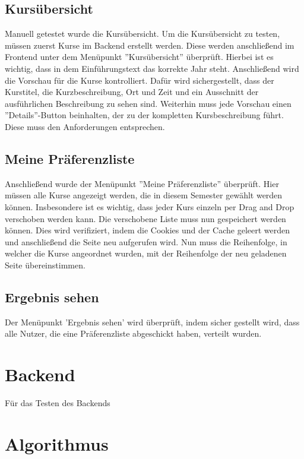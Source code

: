 		\subsection{Kursübersicht}
		Manuell getestet wurde die Kursübersicht.
		Um die Kursübersicht zu testen, müssen zuerst Kurse im Backend erstellt werden.
		Diese werden anschließend im Frontend unter dem Menüpunkt ''Kursübersicht'' überprüft.
		Hierbei ist es wichtig, dass in dem Einführungstext das korrekte Jahr steht.
		Anschließend wird die Vorschau für die Kurse kontrolliert.
		Dafür wird sichergestellt, dass der Kurstitel, die Kurzbeschreibung, Ort und Zeit und ein Ausschnitt der ausführlichen Beschreibung zu sehen sind.
		Weiterhin muss jede Vorschau einen ''Details''-Button beinhalten, der zu der kompletten Kursbeschreibung führt.
		Diese muss den Anforderungen entsprechen.\newline
		
		\subsection{Meine Präferenzliste}
		Anschließend wurde der Menüpunkt ''Meine Präferenzliste'' überprüft.
		Hier müssen alle Kurse angezeigt werden, die in diesem Semester gewählt werden können.
		Insbesondere ist es wichtig, dass jeder Kurs einzeln per Drag and Drop verschoben werden kann.
		Die verschobene Liste muss nun gespeichert werden können.
		Dies wird verifiziert, indem die Cookies und der Cache geleert werden und anschließend die Seite neu aufgerufen wird.
		Nun muss die Reihenfolge, in welcher die Kurse angeordnet wurden, mit der Reihenfolge der neu geladenen Seite übereinstimmen.\newline
		
		\subsection{Ergebnis sehen}
		Der Menüpunkt 'Ergebnis sehen' wird überprüft, indem sicher gestellt wird, dass alle Nutzer, die eine Präferenzliste abgeschickt haben, verteilt wurden.\newline
		
	\section{Backend}
	
		Für das Testen des Backends
	
	\section{Algorithmus}
	
